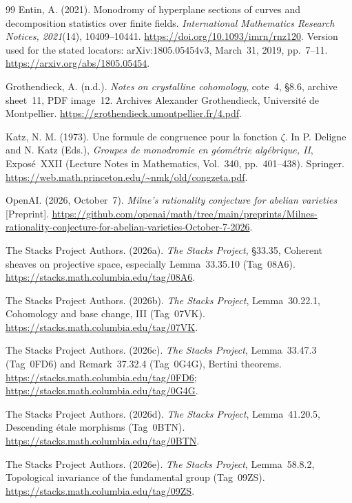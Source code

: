 \documentclass[11pt]{article}
\theoremstyle{remark}\newtheorem{remark}[theorem]{Remark}
\begin{document}
\begin{thebibliography}{99}
Entin, A. (2021). Monodromy of hyperplane sections of curves and decomposition statistics over finite fields. \emph{International Mathematics Research Notices, 2021}(14), 10409--10441. \url{https://doi.org/10.1093/imrn/rnz120}. Version used for the stated locators: arXiv:1805.05454v3, March~31, 2019, pp.~7--11. \url{https://arxiv.org/abs/1805.05454}.

Grothendieck, A. (n.d.). \emph{Notes on crystalline cohomology}, cote~4, \S8.6, archive sheet~11, PDF image~12. Archives Alexander Grothendieck, Universit\'e de Montpellier. \url{https://grothendieck.umontpellier.fr/4.pdf}.

Katz, N. M. (1973). Une formule de congruence pour la fonction $\zeta$. In P. Deligne and N. Katz (Eds.), \emph{Groupes de monodromie en g\'eom\'etrie alg\'ebrique, II}, Expos\'e~XXII (Lecture Notes in Mathematics, Vol.~340, pp.~401--438). Springer. \url{https://web.math.princeton.edu/~nmk/old/congzeta.pdf}.

OpenAI. (2026, October~7). \emph{Milne's rationality conjecture for abelian varieties} [Preprint]. \url{https://github.com/openai/math/tree/main/preprints/Milnes-rationality-conjecture-for-abelian-varieties-October-7-2026}.

The Stacks Project Authors. (2026a). \emph{The Stacks Project}, \S33.35, Coherent sheaves on projective space, especially Lemma~33.35.10 (Tag~08A6). \url{https://stacks.math.columbia.edu/tag/08A6}.

The Stacks Project Authors. (2026b). \emph{The Stacks Project}, Lemma~30.22.1, Cohomology and base change, III (Tag~07VK). \url{https://stacks.math.columbia.edu/tag/07VK}.

The Stacks Project Authors. (2026c). \emph{The Stacks Project}, Lemma~33.47.3 (Tag~0FD6) and Remark~37.32.4 (Tag~0G4G), Bertini theorems. \url{https://stacks.math.columbia.edu/tag/0FD6}; \url{https://stacks.math.columbia.edu/tag/0G4G}.

The Stacks Project Authors. (2026d). \emph{The Stacks Project}, Lemma~41.20.5, Descending \'etale morphisms (Tag~0BTN). \url{https://stacks.math.columbia.edu/tag/0BTN}.

The Stacks Project Authors. (2026e). \emph{The Stacks Project}, Lemma~58.8.2, Topological invariance of the fundamental group (Tag~09ZS). \url{https://stacks.math.columbia.edu/tag/09ZS}.
\end{thebibliography}
\end{document}
